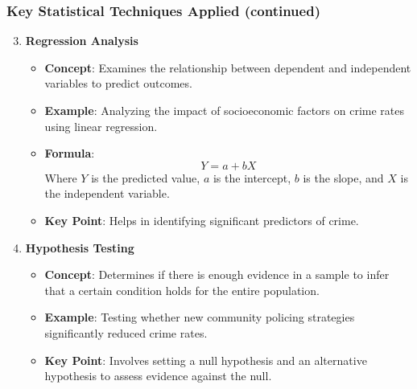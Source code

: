 \documentclass[aspectratio=169]{beamer}
\begin{document}
\begin{frame}[fragile]
    \frametitle{Key Statistical Techniques Applied (continued)}
    \begin{enumerate}
        \setcounter{enumi}{2} %
        \item \textbf{Regression Analysis}
            \begin{itemize}
                \item \textbf{Concept}: Examines the relationship between dependent and independent variables to predict outcomes.
                \item \textbf{Example}: Analyzing the impact of socioeconomic factors on crime rates using linear regression.
                \item \textbf{Formula}: 
                \begin{equation}
                    Y = a + bX
                \end{equation}
                Where \( Y \) is the predicted value, \( a \) is the intercept, \( b \) is the slope, and \( X \) is the independent variable.
                \item \textbf{Key Point}: Helps in identifying significant predictors of crime.
            \end{itemize}

        \item \textbf{Hypothesis Testing}
            \begin{itemize}
                \item \textbf{Concept}: Determines if there is enough evidence in a sample to infer that a certain condition holds for the entire population.
                \item \textbf{Example}: Testing whether new community policing strategies significantly reduced crime rates.
                \item \textbf{Key Point}: Involves setting a null hypothesis and an alternative hypothesis to assess evidence against the null.
            \end{itemize}
    \end{enumerate}
\end{frame}
\end{document}
